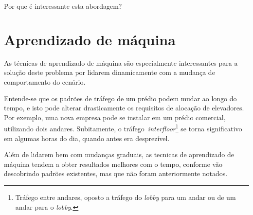 {\color{red}Por que é interessante esta abordagem?}


\section{\label{section:machinelearning}Aprendizado de máquina}

As técnicas de aprendizado de máquina são especialmente interessantes para a
solução deste problema por lidarem dinamicamente com a mudança de comportamento
do cenário.

Entende-se que os padrões de tráfego de um prédio podem mudar ao longo do tempo,
e isto pode alterar drasticamente os requisitos de alocação de elevadores. Por
exemplo, uma nova empresa pode se instalar em um prédio comercial, utilizando
dois andares. Subitamente, o tráfego~\textit{interfloor}\footnote{Tráfego entre
andares, oposto a tráfego do \textit{lobby} para um andar ou de um andar para
o \textit{lobby}.} se torna significativo em algumas horas do dia, quando antes
era desprezível.

Além de lidarem bem com mudanças graduais, as tecnicas de aprendizado de máquina
tendem a obter resultados melhores com o tempo, conforme vão descobrindo padrões
existentes, mas que não foram anteriormente notados.
